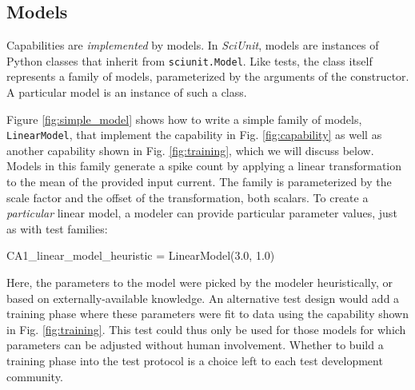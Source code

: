 \documentclass[9pt]{sig-alternate}
\let\verbx\lstinline
\begin{document}
\subsection{Models}
Capabilities are \emph{implemented} by models. In \textit{SciUnit}, models are instances of Python classes that inherit from \verbx{sciunit.Model}. Like tests, the class itself represents a family of models, parameterized by the arguments of the constructor. A particular model is an instance of such a class.

Figure \ref{fig:simple_model} shows how to write a simple {family} of models, \verbx{LinearModel}, that implement the capability in Fig. \ref{fig:capability} as well as another capability shown in Fig. \ref{fig:training}, which we will discuss below. 
Models in this family generate a spike count by applying a linear transformation to the mean of the provided input current. The family is parameterized by the scale factor and the offset of the transformation, both scalars. 
To create a \emph{particular} linear model, a modeler can provide particular parameter values, just as with test families:
\begin{python}
CA1_linear_model_heuristic = LinearModel(3.0, 1.0)
\end{python}
Here, the parameters to the model were picked by the modeler heuristically, or based on externally-available knowledge. 
An alternative test design would add a training phase where these parameters were fit to data using the capability shown in Fig. \ref{fig:training}. 
This test could thus only be used for those models for which parameters can be adjusted without human involvement. 
Whether to build a training phase into the test protocol is a choice left to each test development community. 
\end{document}
